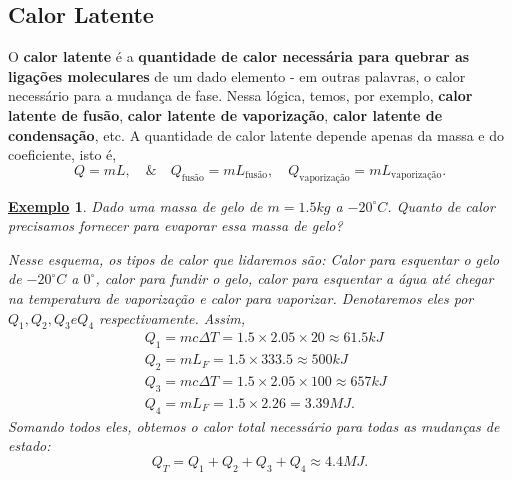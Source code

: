 \documentclass{article}
\newtheorem{example}{\underline{Exemplo}}
\begin{document}
\subsection{Calor Latente}
O \textbf{calor latente} é a \textbf{quantidade de calor necessária para quebrar as ligações moleculares} de um dado elemento - em outras palavras,
o calor necessário para a mudança de fase. Nessa lógica, temos, por exemplo, \textbf{calor latente de fusão}, \textbf{calor latente de vaporização},
\textbf{calor latente de condensação}, etc. A quantidade de calor latente depende apenas da massa e do coeficiente, isto é, 
\[
  Q = mL,\quad\&\quad Q_{\text{fusão}} = mL_{\text{fusão}},\quad Q_{\text{vaporização}} = m L_{\text{vaporização}}.
\]
\begin{example}
  Dado uma massa de gelo de \(m = 1.5kg\) a \(-20^{\circ{}}C\). Quanto de calor precisamos fornecer para evaporar essa massa de gelo?

  Nesse esquema, os tipos de calor que lidaremos são: Calor para esquentar o gelo de \(-20^{\circ{}}C\) a \(0^{\circ{}}\), calor para fundir o gelo, calor para esquentar a água até chegar na temperatura
  de vaporização e calor para vaporizar. Denotaremos eles por \(Q_{1}, Q_{2}, Q_{3} e Q_{4}\)
  respectivamente. Assim,
  \begin{align*}
  &Q_{1} = mc\Delta T = 1.5\times 2.05\times 20\approx 61.5kJ\\
  &Q_{2} = mL_{F} = 1.5\times 333.5\approx 500kJ\\
  &Q_{3} = mc\Delta T = 1.5\times 2.05\times 100\approx 657kJ\\
  &Q_{4} = mL_{F} = 1.5\times 2.26 = 3.39MJ.
  \end{align*}
  Somando todos eles, obtemos o calor total necessário para todas as mudanças de estado: 
  \[
    Q_{T} = Q_{1} + Q_{2} + Q_{3} + Q_{4}\approx 4.4MJ.
  \]
\end{example}
\end{document}
